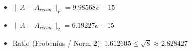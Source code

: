 \begin{itemize}
    \item $\|A - A_{recon}\|_F = 9.98568e-15$
    \item $\|A - A_{recon}\|_2 = 6.19227e-15$
    \item Ratio (Frobenius / Norm-2): $1.612605 \leq \sqrt{8} \approx 2.828427$
\end{itemize}
